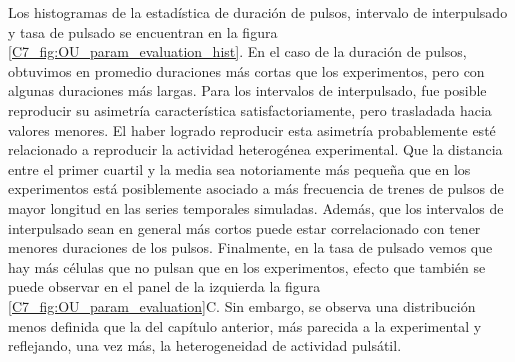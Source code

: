 \documentclass[./main.tex]{subfiles}
\begin{document}
Los histogramas de la estadística de duración de pulsos, intervalo de interpulsado y tasa de pulsado se encuentran en la figura \ref{C7_fig:OU_param_evaluation_hist}. En el caso de la duración de pulsos, obtuvimos en promedio duraciones más cortas que los experimentos, pero con algunas duraciones más largas. Para los intervalos de interpulsado, fue posible reproducir su asimetría característica satisfactoriamente, pero trasladada hacia valores menores. El haber logrado reproducir esta asimetría probablemente esté relacionado a reproducir la actividad heterogénea experimental. Que la distancia entre el primer cuartil y la media sea notoriamente más pequeña que en los experimentos está posiblemente asociado a más frecuencia de trenes de pulsos de mayor longitud en las series temporales simuladas. Además, que los intervalos de interpulsado sean en general más cortos puede estar correlacionado con tener menores duraciones de los pulsos. Finalmente, en la tasa de pulsado vemos que hay más células que no pulsan que en los experimentos, efecto que también se puede observar en el panel de la izquierda la figura \ref{C7_fig:OU_param_evaluation}C. Sin embargo, se observa una distribución menos definida que la del capítulo anterior, más parecida a la experimental y reflejando, una vez más, la heterogeneidad de actividad pulsátil. 
\end{document}
